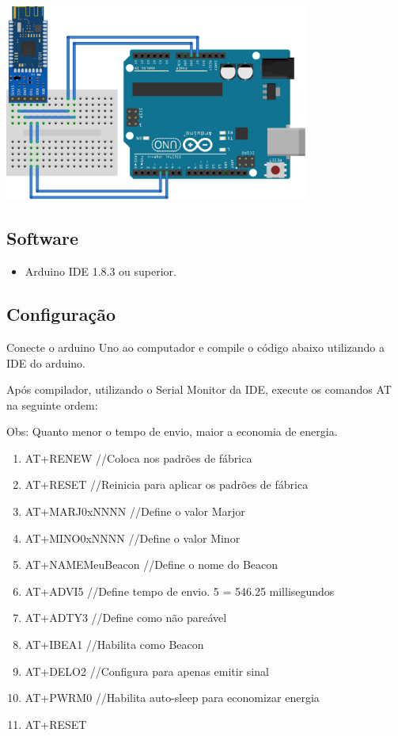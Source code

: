 \documentclass[a4paper, 12pt]{article}
\begin{document}
\includegraphics[width=10cm, center]{images/arduino-hm10}

\subsection{Software}

\begin{itemize}
\item Arduino IDE 1.8.3 ou superior. 
\end{itemize}

\subsection{Configuração}

Conecte o arduino Uno ao computador e compile o código abaixo utilizando a IDE do arduino.



Após compilador, utilizando o Serial Monitor da IDE, execute os comandos AT na seguinte ordem:

Obs: Quanto menor o tempo de envio, maior a economia de energia.

\begin{enumerate}
\item AT+RENEW //Coloca nos padrões de fábrica
\item AT+RESET //Reinicia para aplicar os padrões de fábrica
\item AT+MARJ0xNNNN //Define o valor Marjor
\item AT+MINO0xNNNN //Define o valor Minor
\item AT+NAMEMeuBeacon //Define o nome do Beacon
\item AT+ADVI5 //Define tempo de envio. 5 = 546.25 millisegundos
\item AT+ADTY3 //Define como não pareável
\item AT+IBEA1 //Habilita como Beacon
\item AT+DELO2 //Configura para apenas emitir sinal
\item AT+PWRM0 //Habilita auto-sleep para economizar energia
\item AT+RESET
\end{enumerate}
\end{document}
